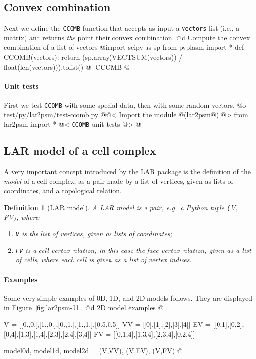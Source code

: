 \documentclass[11pt,oneside]{article}    %
\newtheorem{definition}{Definition}
\begin{document}
\subsection{Convex combination}
Next we define the \texttt{CCOMB} function that accepts as input a \texttt{vectors} list (i.e., a matrix) and returns \emph{the} point their convex combination.
@d Compute the convex combination of a list of vectors
@{import scipy as sp
from pyplasm import *
def CCOMB(vectors):
    return (sp.array(VECTSUM(vectors)) / float(len(vectors))).tolist()  
@| CCOMB @}

\paragraph{Unit tests}
First we test \texttt{CCOMB} with some special data, then with some random vectors.
@o test/py/lar2psm/test-ccomb.py
@{@< Import the module @(lar2psm@) @>
from lar2psm import *
@< \texttt{CCOMB} unit tests @>
@}

\subsection{LAR model of a cell complex}

A very important concept introduced by the LAR package is the definition of the \emph{model} of a cell complex, as a pair made by a list of vertices, given as lists of coordinates, and a topological relation.

\begin{definition}[LAR model]
A \emph{LAR model} is a pair, e.g.~a Python tuple \emph{\texttt(V, FV)}, where:
\begin{enumerate}
\item \texttt{V} is the list of vertices, given as lists of coordinates;
\item \texttt{FV} is a \emph{cell-vertex} relation, in this case the face-vertex relation, given as a list of cells, where each cell is given as a list of vertex indices.
\end{enumerate}
\end{definition}

\paragraph{Examples} 
Some very simple examples of 0D, 1D, and 2D models follows. They are displayed in Figure~\ref{fig:lar2psm-01}.
@d 2D model examples 
@{V = [[0.,0.],[1.,0.],[0.,1.],[1.,1.],[0.5,0.5]]
VV = [[0],[1],[2],[3],[4]]
EV = [[0,1],[0,2],[0,4],[1,3],[1,4],[2,3],[2,4],[3,4]]
FV = [[0,1,4],[1,3,4],[2,3,4],[0,2,4]]

model0d, model1d, model2d = (V,VV), (V,EV), (V,FV)
@}
\end{document}
